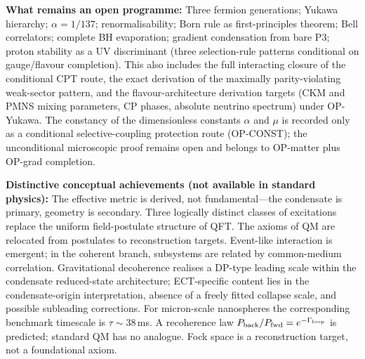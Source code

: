 \documentclass[11pt,a4paper]{article}
\begin{document}
\textbf{What remains an open programme:}
Three fermion generations; Yukawa hierarchy; $\alpha = 1/137$; renormalisability; Born rule as first-principles theorem; Bell correlators; complete BH evaporation; gradient condensation from bare P3; proton stability as a UV discriminant (three selection-rule patterns conditional on gauge/flavour completion). This also includes the full interacting closure of the conditional CPT route, the exact derivation of the maximally parity-violating weak-sector pattern, and the flavour-architecture derivation targets (CKM and PMNS mixing parameters, CP phases, absolute neutrino spectrum) under OP-Yukawa. The constancy of the dimensionless constants $\alpha$ and $\mu$ is recorded only as a conditional selective-coupling protection route (OP-CONST); the unconditional microscopic proof remains open and belongs to OP-matter plus OP-grad completion.

\textbf{Distinctive conceptual achievements (not available in standard physics):}
The effective metric is derived, not fundamental---the condensate is primary, geometry is secondary.
Three logically distinct classes of excitations replace the uniform field-postulate structure of QFT.
The axioms of QM are relocated from postulates to reconstruction targets.
Event-like interaction is emergent; in the coherent branch, subsystems are related by common-medium correlation.
Gravitational decoherence realises a DP-type leading scale within the condensate reduced-state architecture; ECT-specific content lies in the condensate-origin interpretation, absence of a freely fitted collapse scale, and possible subleading corrections. For micron-scale nanospheres the corresponding benchmark timescale is $\tau\sim38$\,ms.
A recoherence law $P_{\rm back}/P_{\rm fwd}=e^{-\Gamma_{\rm loop}}$ is predicted; standard QM has no analogue.
Fock space is a reconstruction target, not a foundational axiom.
\end{document}
